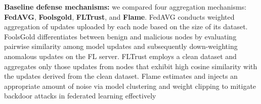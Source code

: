 \documentclass[lettersize,journal]{IEEEtran}
\begin{document}
\textbf{Baseline defense mechanisms:} 
we compared four aggregation mechanisms: \textbf{FedAVG}\cite{FedAVG}, \textbf{Foolsgold}\cite{foolsgold}, \textbf{FLTrust}\cite{FLTrust}, and \textbf{Flame}\cite{FLAME}. FedAVG conducts weighted aggregation of updates uploaded by each node based on the size of its dataset. FoolsGold differentiates between benign and malicious nodes by evaluating pairwise similarity among model updates and subsequently down-weighting anomalous updates on the FL server. FLTrust employs a clean dataset and aggregates only those updates from nodes that exhibit high cosine similarity with the updates derived from the clean dataset. Flame estimates and injects an appropriate amount of noise via model clustering and weight clipping to mitigate backdoor attacks in federated learning effectively\color{black}{.}
    
\end{document}
